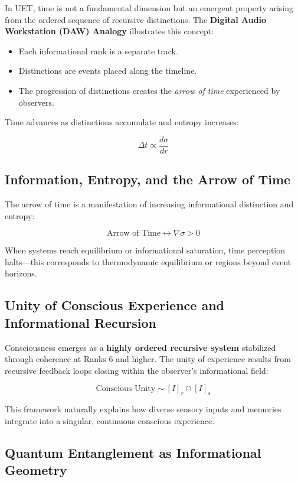 \documentclass[12pt,a4paper]{article}
\begin{document}
In UET, time is not a fundamental dimension but an emergent property arising from the ordered sequence of recursive distinctions. The \textbf{Digital Audio Workstation (DAW) Analogy} illustrates this concept:

\begin{itemize}
    \item Each informational rank is a separate track.
    \item Distinctions are events placed along the timeline.
    \item The progression of distinctions creates the \textit{arrow of time} experienced by observers.
\end{itemize}

Time advances as distinctions accumulate and entropy increases:

\[
\Delta t \propto \frac{d\sigma}{dr}
\]

\subsection{Information, Entropy, and the Arrow of Time}

The arrow of time is a manifestation of increasing informational distinction and entropy:

\[
\text{Arrow of Time} \leftrightarrow \nabla \sigma > 0
\]

When systems reach equilibrium or informational saturation, time perception halts—this corresponds to thermodynamic equilibrium or regions beyond event horizons.

\subsection{Unity of Conscious Experience and Informational Recursion}

Consciousness emerges as a \textbf{highly ordered recursive system} stabilized through coherence at Ranks 6 and higher. The unity of experience results from recursive feedback loops closing within the observer’s informational field:

\[
\text{Conscious Unity} \sim [I]_r \cap [I]_s
\]

This framework naturally explains how diverse sensory inputs and memories integrate into a singular, continuous conscious experience.

\subsection{Quantum Entanglement as Informational Geometry}
\end{document}
